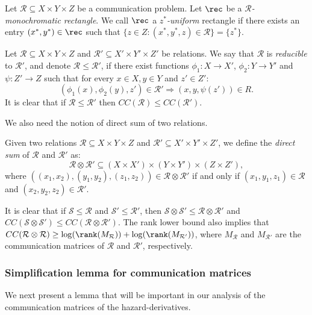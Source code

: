 \documentclass[acmsmall, nonacm, authorversion]{acmart}
\begin{document}
\begin{definition}\label{def:d-colored-combinatorial-rec}
Let $\mathcal{R}\subseteq X\times Y \times Z$ be a communication problem. Let $\rec$ be a \emph{$\mathcal{R}$-monochromatic rectangle}. We call $\rec$ a \emph{$z^*$-uniform} rectangle if there exists an entry $(x^*,y^*)\in \rec$ such that $\{z\in Z: (x^*,y^*,z)\in \mathcal{R}\}=\{z^*\}$.
\end{definition}

Let $\mathcal{R}\subseteq X\times Y \times Z$ and $\mathcal{R}'\subseteq X'\times Y'\times Z'$ be relations. We say that $\mathcal{R}$ is \emph{reducible} to $\mathcal{R}'$, and denote $\mathcal{R}\le \mathcal{R}'$, if there exist functions $\phi_1:X\rightarrow X'$, $\phi_2:Y\rightarrow Y'$ and $\psi:Z'\rightarrow Z$ such that for every $x\in X,y\in Y$ and $z'\in Z'$:
\[
(\phi_1(x),\phi_2(y),z')\in \mathcal{R}'\Rightarrow(x,y,\psi(z'))\in R.
\]
It is clear that if $\mathcal{R}\le \mathcal{R}'$ then $CC(\mathcal{R})\le CC(\mathcal{R}')$.

We also need the notion of direct sum of two relations.

\begin{definition}\label{def:direct-sum-relations}
Given two relations $\mathcal{R} \subseteq X \times Y \times Z$ and $\mathcal{R}' \subseteq X' \times Y' \times Z'$, we define the \emph{direct sum} of $\mathcal{R}$ and $\mathcal{R}'$ as:
\[
\mathcal{R} \otimes \mathcal{R}' \subseteq (X \times X') \times (Y \times Y') \times (Z \times Z'),
\]
where $((x_1, x_2), (y_1, y_2), (z_1, z_2)) \in \mathcal{R} \otimes \mathcal{R}'$ if and only if $(x_1, y_1, z_1) \in \mathcal{R}$ and $(x_2, y_2, z_2) \in \mathcal{R}'$.
\end{definition}

It is clear that if $\mathcal{S}\le\mathcal{R}$ and $\mathcal{S}'\le\mathcal{R}'$, then
$\mathcal{S} \otimes \mathcal{S}'\le\mathcal{R}\otimes \mathcal{R}'$ and $CC(\mathcal{S} \otimes \mathcal{S}')\leq CC(\mathcal{R}\otimes \mathcal{R}')$. The rank lower bound \cite[Lemma 1.28]{KN97} also implies that $
CC(\mathcal{R} \otimes \mathcal{R}) \ge \log(\rank(M_{\mathcal{R}}))+\log(\rank(M_{\mathcal{R}'}))$, where $M_{\mathcal{R}}$ and $M_{\mathcal{R}'}$ are the communication matrices of $\mathcal{R}$ and $\mathcal{R}'$, respectively.

\subsubsection{Simplification lemma for communication matrices}\label{subsec:simplification-lem}
We next present a lemma that will be important in our analysis of the communication matrices of the hazard-derivatives. 
\end{document}
